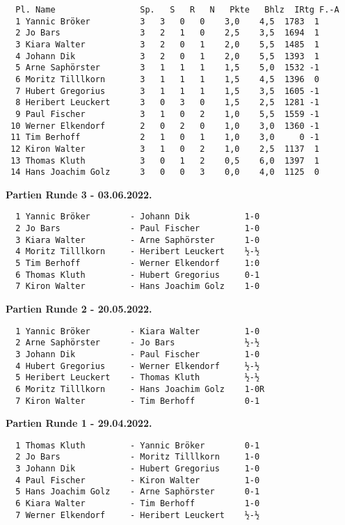 \documentclass[
]{article}
\begin{document}
\begin{verbatim}
  Pl. Name                 Sp.   S   R   N   Pkte   Bhlz  IRtg F.-A
  1 Yannic Bröker          3   3   0   0    3,0    4,5  1783  1
  2 Jo Bars                3   2   1   0    2,5    3,5  1694  1
  3 Kiara Walter           3   2   0   1    2,0    5,5  1485  1
  4 Johann Dik             3   2   0   1    2,0    5,5  1393  1
  5 Arne Saphörster        3   1   1   1    1,5    5,0  1532 -1
  6 Moritz Tilllkorn       3   1   1   1    1,5    4,5  1396  0
  7 Hubert Gregorius       3   1   1   1    1,5    3,5  1605 -1
  8 Heribert Leuckert      3   0   3   0    1,5    2,5  1281 -1
  9 Paul Fischer           3   1   0   2    1,0    5,5  1559 -1
 10 Werner Elkendorf       2   0   2   0    1,0    3,0  1360 -1
 11 Tim Berhoff            2   1   0   1    1,0    3,0     0 -1
 12 Kiron Walter           3   1   0   2    1,0    2,5  1137  1
 13 Thomas Kluth           3   0   1   2    0,5    6,0  1397  1
 14 Hans Joachim Golz      3   0   0   3    0,0    4,0  1125  0
\end{verbatim}

\textbf{Partien Runde 3 - 03.06.2022.}

\begin{verbatim}
  1 Yannic Bröker        - Johann Dik           1-0    
  2 Jo Bars              - Paul Fischer         1-0    
  3 Kiara Walter         - Arne Saphörster      1-0    
  4 Moritz Tilllkorn     - Heribert Leuckert    ½-½    
  5 Tim Berhoff          - Werner Elkendorf     1:0  
  6 Thomas Kluth         - Hubert Gregorius     0-1    
  7 Kiron Walter         - Hans Joachim Golz    1-0    
\end{verbatim}

\textbf{Partien Runde 2 - 20.05.2022.}

\begin{verbatim}
  1 Yannic Bröker        - Kiara Walter         1-0    
  2 Arne Saphörster      - Jo Bars              ½-½    
  3 Johann Dik           - Paul Fischer         1-0    
  4 Hubert Gregorius     - Werner Elkendorf     ½-½    
  5 Heribert Leuckert    - Thomas Kluth         ½-½    
  6 Moritz Tilllkorn     - Hans Joachim Golz    1-0R   
  7 Kiron Walter         - Tim Berhoff          0-1    
\end{verbatim}

\textbf{Partien Runde 1 - 29.04.2022.}

\begin{verbatim}
  1 Thomas Kluth         - Yannic Bröker        0-1    
  2 Jo Bars              - Moritz Tilllkorn     1-0    
  3 Johann Dik           - Hubert Gregorius     1-0    
  4 Paul Fischer         - Kiron Walter         1-0    
  5 Hans Joachim Golz    - Arne Saphörster      0-1    
  6 Kiara Walter         - Tim Berhoff          1-0    
  7 Werner Elkendorf     - Heribert Leuckert    ½-½   
\end{verbatim}
\end{document}

